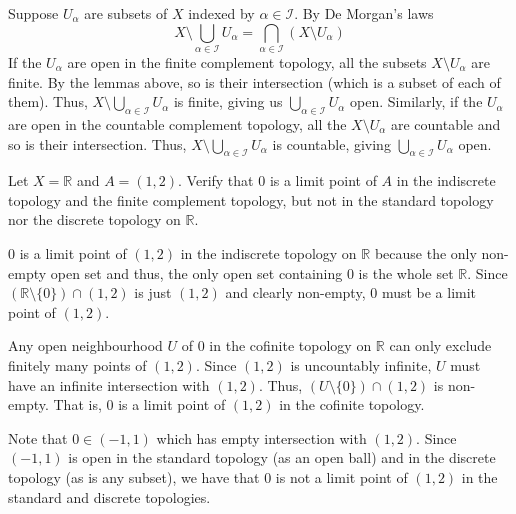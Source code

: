 \documentclass[12 pt, letterpaper]{hmcpset}
\begin{document}
\begin{solution}
	Suppose $U_{\alpha}$ are subsets of $X$ indexed by $\alpha \in \mathcal{I}$. By De Morgan's laws
	\[
		X \setminus \bigcup_{\alpha \in \mathcal{I}} U_{\alpha} = \bigcap_{\alpha \in \mathcal{I}} (X \setminus U_{\alpha})
	\]
	If the $U_{\alpha}$ are open in the finite complement topology, all the subsets $X \setminus U_{\alpha}$ are finite. By the lemmas above, so is their intersection (which is a subset of each of them). Thus, $X \setminus \bigcup_{\alpha \in \mathcal{I}} U_{\alpha}$ is finite, giving us $\bigcup_{\alpha \in \mathcal{I}} U_{\alpha}$ open. Similarly, if the $U_{\alpha}$ are open in the countable complement topology, all the $X \setminus U_{\alpha}$ are countable and so is their intersection. Thus, $X \setminus \bigcup_{\alpha \in \mathcal{I}} U_{\alpha}$ is countable, giving $\bigcup_{\alpha \in \mathcal{I}} U_{\alpha}$ open.
	
\end{solution}

\pagebreak

\begin{problem}[Exercise 2.8]
	Let $X = \mathbb{R}$ and $A = (1, 2)$. Verify that $0$ is a limit point of $A$ in the indiscrete topology and the finite complement topology, but not in the standard topology nor the discrete topology on $\mathbb{R}$.
\end{problem}

\begin{solution}
	$0$ is a limit point of $(1, 2)$ in the indiscrete topology on $\mathbb{R}$ because the only non-empty open set and thus, the only open set containing $0$ is the whole set $\mathbb{R}$. Since $(\mathbb{R} \setminus \{ 0 \}) \cap (1, 2)$ is just $(1, 2)$ and clearly non-empty, $0$ must be a limit point of $(1, 2)$.

	Any open neighbourhood $U$ of $0$ in the cofinite topology on $\mathbb{R}$ can only exclude finitely many points of $(1, 2)$. Since $(1, 2)$ is uncountably infinite, $U$ must have an infinite intersection with $(1, 2)$. Thus, $(U \setminus \{ 0 \}) \cap (1, 2)$ is non-empty. That is, $0$ is a limit point of $(1, 2)$ in the cofinite topology.

	Note that $0 \in (-1, 1)$ which has empty intersection with $(1, 2)$. Since $(-1, 1)$ is open in the standard topology (as an open ball) and in the discrete topology (as is any subset), we have that $0$ is not a limit point of $(1, 2)$ in the standard and discrete topologies.
\end{solution}
	
\end{document}
